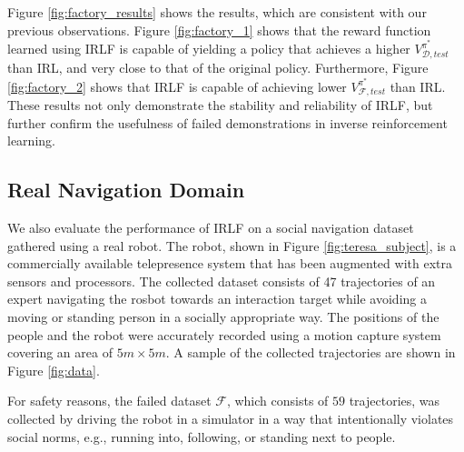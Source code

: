 \documentclass{aamas2016}
\begin{document}
Figure \ref{fig:factory_results} shows the results, which are consistent with our previous observations. Figure \ref{fig:factory_1} shows that the reward function learned using IRLF is capable of yielding a policy that achieves a higher $V^{\pi^*}_{\mathcal{D},test}$ than IRL, and very close to that of the original policy. Furthermore, Figure \ref{fig:factory_2} shows that IRLF is capable of achieving lower $V^{\pi^*}_{\mathcal{F},test}$ than IRL. These results not only demonstrate the stability and reliability of IRLF, but further confirm the usefulness of failed demonstrations in inverse reinforcement learning.


\subsection{Real Navigation Domain}
We also evaluate the performance of IRLF on a social navigation dataset gathered using a real robot. The robot, shown in Figure \ref{fig:teresa_subject}, is a commercially available telepresence system that has been augmented with extra sensors and processors. The collected dataset consists of 47 trajectories of an expert navigating the rosbot towards an interaction target while avoiding a moving or standing  person in a socially appropriate way. The positions of the people and the robot were accurately recorded using a motion capture system covering an area of $5m \times 5m$. A sample of the collected trajectories are shown in Figure \ref{fig:data}. 

For safety reasons, the failed dataset $\mathcal{F}$, which consists of $59$ trajectories, was collected by driving the robot in a simulator in a way that intentionally violates social norms, e.g., running into, following, or standing next to people. 
\end{document}
